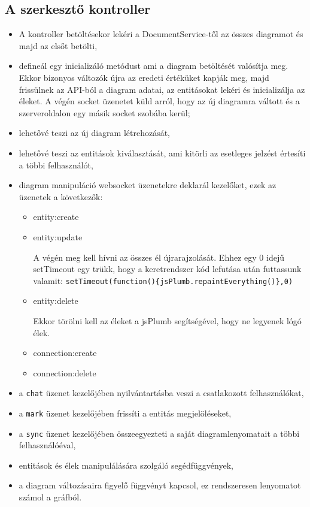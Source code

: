 \subsection{A szerkesztő kontroller}

\begin{itemize}
\item A kontroller betöltésekor lekéri a DocumentService-től az összes diagramot és majd az elsőt betölti,
\item defineál egy inicializáló metódust ami a diagram betöltését valósítja meg. Ekkor bizonyos változók újra az eredeti értéküket kapják meg, majd frissülnek az API-ból a diagram adatai, az entitásokat lekéri és inicializálja az éleket. A végén socket üzenetet küld arról, hogy az új diagramra váltott és a szerveroldalon egy másik socket szobába kerül;
\item lehetővé teszi az új diagram létrehozását,
\item lehetővé teszi az entitások kiválasztását, ami kitörli az esetleges jelzést értesíti a többi felhasználót,
\item diagram manipuláció websocket üzenetekre deklarál kezelőket, ezek az üzenetek a következők:
\begin{itemize}
\item entity:create
\item entity:update

A végén meg kell hívni az összes él újrarajzolását. Ehhez egy 0 idejű setTimeout egy trükk, hogy a keretrendszer kód lefutása után futtassunk valamit: \lstinline|setTimeout(function(){jsPlumb.repaintEverything()},0)|

\item entity:delete

Ekkor törölni kell az éleket a jsPlumb segítségével, hogy ne legyenek lógó élek.

\item connection:create
\item connection:delete

\end{itemize}

\item a \lstinline{chat} üzenet kezelőjében nyilvántartásba veszi a csatlakozott felhasználókat,
\item a \lstinline{mark} üzenet kezelőjében frissíti a entitás megjelöléseket,
\item a \lstinline{sync} üzenet kezelőjében összeegyezteti a saját diagramlenyomatait a többi felhasználóéval,
\item entitások és élek manipulálására szolgáló segédfüggvények,
\item a diagram változásaira figyelő függvényt kapcsol, ez rendszeresen lenyomatot számol a gráfból.

\end{itemize}



